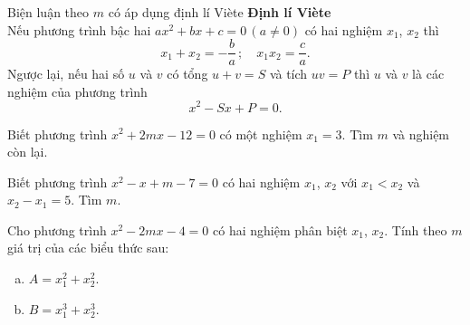 	\begin{dang}
	{Biện luận theo $m$ có áp dụng định lí Viète}
	\textbf{Định lí Viète}\\
	Nếu phương trình bậc hai $ax^2+bx+c=0\, (a\neq0)$ có hai nghiệm $x_1$, $x_2$ thì
	$$x_1+x_2=-\dfrac{b}{a}\,;\quad x_1x_2=\dfrac{c}{a}.$$
	Ngược lại, nếu hai số $u$ và $v$ có tổng $u+v=S$ và tích $uv=P$ thì $u$ và $v$ là các nghiệm của phương trình 
	$$x^2-Sx+P=0.$$
\end{dang}	

\begin{vd}%
	Biết phương trình $x^2+2mx-12=0$ có một nghiệm $x_1=3$. Tìm $m$ và nghiệm còn lại.
\end{vd}

\begin{vd}%
	Biết phương trình $x^2-x+m-7=0$ có hai nghiệm $x_1$, $x_2$ với $x_1<x_2$ và $x_2-x_1=5$. Tìm $m$.
\end{vd}

\begin{vd}%
	Cho phương trình $x^2-2mx-4=0$ có hai nghiệm phân biệt $x_1$, $x_2$. Tính theo $m$ giá trị của các biểu thức sau:
	\begin{multicols}{2}
		\begin{enumerate}[a)]
			\item $A=x_1^2+x_2^2$.
			\item $B=x_1^3+x_2^3$.
		\end{enumerate}
	\end{multicols}
\end{vd}

